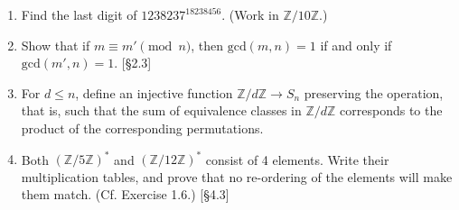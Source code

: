 \begin{enumerate}
    \item Find the last digit of $1238237^{18238456}$. (Work in $\mathbb{Z}/10\mathbb{Z}$.)

    \item Show that if $m \equiv m' \pmod n$, then $\text{gcd}(m, n)=1$ if and only if $\text{gcd}(m', n)=1$. [\S2.3]

    \item For $d \le n$, define an injective function $\mathbb{Z}/d\mathbb{Z} \to S_n$ preserving the operation, that is, such that the sum of equivalence classes in $\mathbb{Z}/d\mathbb{Z}$ corresponds to the product of the corresponding permutations.

    \item Both $(\mathbb{Z}/5\mathbb{Z})^*$ and $(\mathbb{Z}/12\mathbb{Z})^*$ consist of 4 elements. Write their multiplication tables, and prove that no re-ordering of the elements will make them match. (Cf. Exercise 1.6.) [\S4.3]
\end{enumerate}
